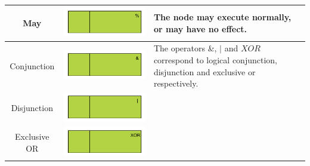 \documentclass[]{article}
\begin{document}
\begin{tabularx}{\textwidth}{|c|c|X|}
May &\includegraphics{figs/AppendixB/Operators/May} & The node may execute normally, or may have no effect.\\ \hline
Conjunction &\includegraphics{figs/AppendixB/Operators/Conjunction} & The operators \&, $|$ and $XOR$ correspond to logical conjunction, disjunction and exclusive or respectively.\\ 
 \cline{1-2}
Disjunction &\includegraphics{figs/AppendixB/Operators/Disjunction} &\\
 \cline{1-2}
Exclusive OR &\includegraphics{figs/AppendixB/Operators/XOR} &
\end{tabularx}
\end{document}
